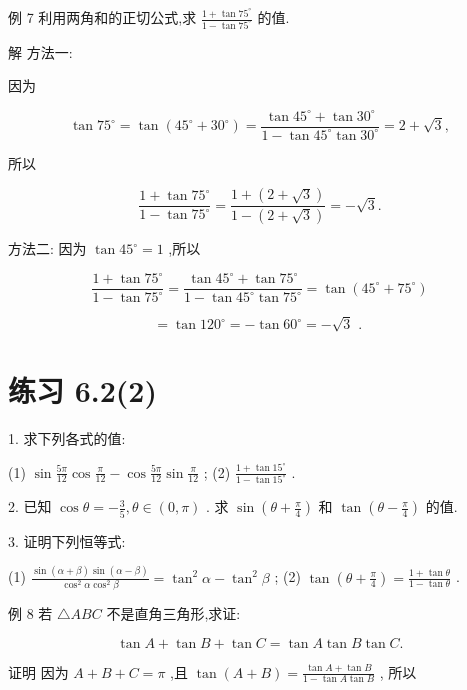 \documentclass[10pt]{article}
\begin{document}
例 7 利用两角和的正切公式,求 \(\frac{1 + \tan {75}^{ \circ  }}{1 - \tan {75}^{ \circ  }}\) 的值.

解 方法一:

因为

\[
\tan {75}^{ \circ  } = \tan \left( {{45}^{ \circ  } + {30}^{ \circ  }}\right)  = \frac{\tan {45}^{ \circ  } + \tan {30}^{ \circ  }}{1 - \tan {45}^{ \circ  }\tan {30}^{ \circ  }} = 2 + \sqrt{3},
\]

所以

\[
\frac{1 + \tan {75}^{ \circ  }}{1 - \tan {75}^{ \circ  }} = \frac{1 + \left( {2 + \sqrt{3}}\right) }{1 - \left( {2 + \sqrt{3}}\right) } =  - \sqrt{3}.
\]

方法二: 因为 \(\tan {45}^{ \circ  } = 1\) ,所以

\[
\frac{1 + \tan {75}^{ \circ  }}{1 - \tan {75}^{ \circ  }} = \frac{\tan {45}^{ \circ  } + \tan {75}^{ \circ  }}{1 - \tan {45}^{ \circ  }\tan {75}^{ \circ  }} = \tan \left( {{45}^{ \circ  } + {75}^{ \circ  }}\right)
\]

\[
= \tan {120}^{ \circ  } =  - \tan {60}^{ \circ  } =  - \sqrt{3}\text{ . }
\]

\section*{练习 6.2(2)}

1. 求下列各式的值:

(1) \(\sin \frac{5\pi }{12}\cos \frac{\pi }{12} - \cos \frac{5\pi }{12}\sin \frac{\pi }{12}\) ; (2) \(\frac{1 + \tan {15}^{ \circ  }}{1 - \tan {15}^{ \circ  }}\) .

2. 已知 \(\cos \theta  =  - \frac{3}{5},\theta  \in  \left( {0,\pi }\right)\) . 求 \(\sin \left( {\theta  + \frac{\pi }{4}}\right)\) 和 \(\tan \left( {\theta  - \frac{\pi }{4}}\right)\) 的值.

3. 证明下列恒等式:

(1) \(\frac{\sin \left( {\alpha  + \beta }\right) \sin \left( {\alpha  - \beta }\right) }{{\cos }^{2}\alpha {\cos }^{2}\beta } = {\tan }^{2}\alpha  - {\tan }^{2}\beta\) ; (2) \(\tan \left( {\theta  + \frac{\pi }{4}}\right)  = \frac{1 + \tan \theta }{1 - \tan \theta }\) .

例 8 若 \(\bigtriangleup {ABC}\) 不是直角三角形,求证:

\[
\tan A + \tan B + \tan C = \tan A\tan B\tan C.
\]

证明 因为 \(A + B + C = \pi\) ,且 \(\tan \left( {A + B}\right)  = \frac{\tan A + \tan B}{1 - \tan A\tan B}\) , 所以
\end{document}

